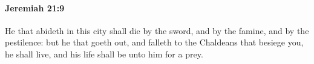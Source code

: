 
		\paragraph{Jeremiah 21:9} %
			\label{JEREMIAH-21-9}

			He that abideth in this city shall die by the sword, and by the famine, and by the pestilence: but he that goeth out, and falleth to the Chaldeans that besiege you, he shall live, and his life shall be unto him for a prey.


